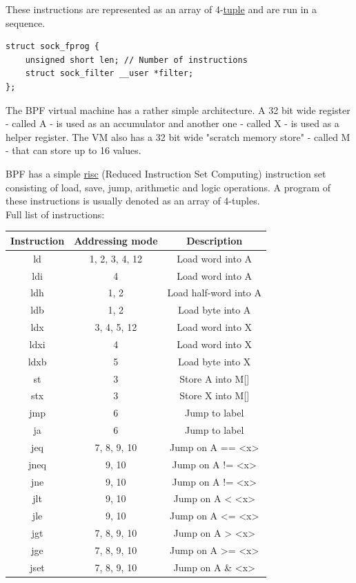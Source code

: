 These instructions are represented as an array of 4-\underline{\gls{tuple}} and are run in a sequence.

\begin{verbatim}
struct sock_fprog {
	unsigned short len; // Number of instructions
	struct sock_filter __user *filter;
};
\end{verbatim}

The BPF virtual machine has a rather simple architecture. A 32 bit wide register - called A - is used as an accumulator and another one - called X - is used as a helper register. The VM also has a 32 bit wide "scratch memory store" - called M - that can store up to 16 values.

BPF has a simple \underline{\gls{risc}} (Reduced Instruction Set Computing) instruction set consisting of load, save, jump, arithmetic and logic operations. A program of these instructions is usually denoted as an array of 4-tuples. \\
 
Full list of instructions:
\begin{center}
 \begin{tabular}{||c c c||} 
 \hline
 Instruction & Addressing mode & Description \\ [0.5ex] 
 \hline\hline
  ld & 1, 2, 3, 4, 12 & Load word into A \\
  \hline
  ldi &  4 & Load word into A \\
  \hline
  ldh &  1, 2 & Load half-word into A \\
  \hline
  ldb & 1, 2 & Load byte into A \\
  \hline
  ldx & 3, 4, 5, 12 & Load word into X \\
  \hline
  ldxi & 4 & Load word into X \\
  \hline
  ldxb & 5 & Load byte into X \\
  \hline
  \hline
  st & 3 & Store A into M[] \\
  \hline
  stx & 3 & Store X into M[] \\
  \hline
  \hline
  jmp & 6 & Jump to label \\
  \hline
  ja & 6 & Jump to label \\
  \hline
  jeq & 7, 8, 9, 10 & Jump on A == <x> \\
  \hline
  jneq & 9, 10 & Jump on A != <x> \\
  \hline
  jne & 9, 10 & Jump on A != <x> \\
  \hline
  jlt & 9, 10 & Jump on A <  <x> \\
  \hline
  jle & 9, 10 & Jump on A <= <x> \\
  \hline
  jgt & 7, 8, 9, 10 & Jump on A >  <x> \\
  \hline
  jge & 7, 8, 9, 10 & Jump on A >= <x> \\
  \hline
  jset & 7, 8, 9, 10 & Jump on A \&  <x> \\
  \hline
\end{tabular}
\end{center}

